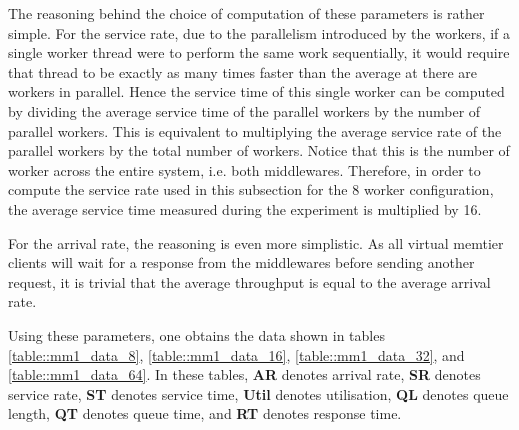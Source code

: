 \documentclass[11pt,a4paper]{article}
\begin{document}
The reasoning behind the choice of computation of these parameters is rather simple. For the service rate, due to the parallelism introduced by the workers, if a single worker thread were to perform the same work sequentially, it would require that thread to be exactly as many times faster than the average at there are workers in parallel. Hence the service time of this single worker can be computed by dividing the average service time of the parallel workers by the number of parallel workers. This is equivalent to multiplying the average service rate of the parallel workers by the total number of workers. Notice that this is the number of worker across the entire system, i.e. both middlewares. Therefore, in order to compute the service rate used in this subsection for the 8 worker configuration, the average service time measured during the experiment is multiplied by 16.

For the arrival rate, the reasoning is even more simplistic. As all virtual memtier clients will wait for a response from the middlewares before sending another request, it is trivial that the average throughput is equal to the average arrival rate.

Using these parameters, one obtains the data shown in tables \ref{table::mm1_data_8}, \ref{table::mm1_data_16}, \ref{table::mm1_data_32}, and \ref{table::mm1_data_64}. In these tables, \textbf{AR} denotes arrival rate, \textbf{SR} denotes service rate, \textbf{ST} denotes service time, \textbf{Util} denotes utilisation, \textbf{QL} denotes queue length, \textbf{QT} denotes queue time, and \textbf{RT} denotes response time.
\end{document}
